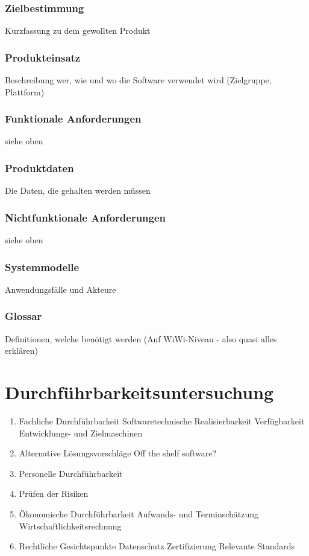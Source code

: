 \documentclass[a4paper]{article}
\theoremstyle{break}
\begin{document}
\subsubsection{Zielbestimmung}
Kurzfassung zu dem gewollten Produkt
\subsubsection{Produkteinsatz}
Beschreibung wer, wie und wo die Software verwendet wird (Zielgruppe, Plattform)
\subsubsection{Funktionale Anforderungen}
siehe oben
\subsubsection{Produktdaten}
Die Daten, die gehalten werden müssen
\subsubsection{Nichtfunktionale Anforderungen}
siehe oben
\subsubsection{Systemmodelle}
Anwendungsfälle und Akteure
\subsubsection{Glossar}
Definitionen, welche benötigt werden (Auf WiWi-Niveau - also quasi alles erklären)
\newpage
\section{Durchführbarkeitsuntersuchung}
\begin{enumerate}
	\item Fachliche Durchführbarkeit
		\subitem Softwaretechnische Realisierbarkeit
		\subitem Verfügbarkeit Entwicklungs- und Zielmaschinen
	\item Alternative Lösungsvorschläge
		\subitem Off the shelf software?
	\item Personelle Durchführbarkeit
	\item Prüfen der Risiken
	\item Ökonomische Durchführbarkeit
		\subitem Aufwands- und Terminschätzung
		\subitem Wirtschaftlichkeitsrechnung
	\item Rechtliche Gesichtspunkte
		\subitem Datenschutz
		\subitem Zertifizierung
		\subitem Relevante Standards
\end{enumerate}
\end{document}
